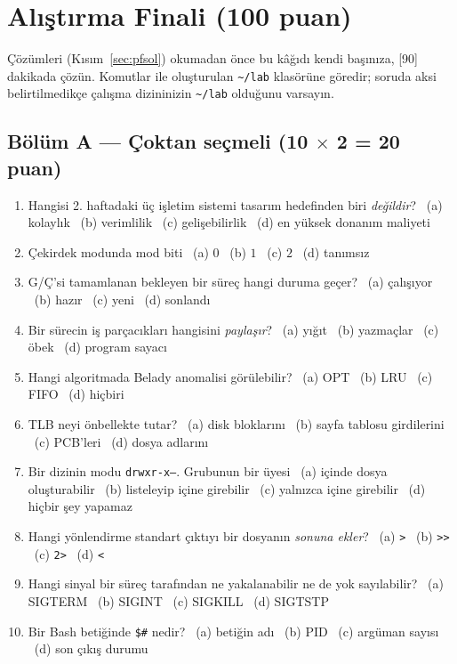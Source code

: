 \section{Alıştırma Finali (100 puan)}
\label{sec:pf}

{\sloppy Çözümleri (Kısım~\ref{sec:pfsol}) okumadan önce bu kâğıdı kendi başınıza, [90] dakikada çözün. Komutlar  ile oluşturulan \texttt{\textasciitilde/lab} klasörüne göredir; soruda aksi belirtilmedikçe çalışma dizininizin \texttt{\textasciitilde/lab} olduğunu varsayın.\par}

\subsection*{Bölüm A --- Çoktan seçmeli (10 $\times$ 2 = 20 puan)}
\begin{enumerate}[leftmargin=1.6em,label=A\arabic*.]
  \item Hangisi 2. haftadaki üç işletim sistemi tasarım hedefinden biri \emph{değildir}? \ (a) kolaylık \ (b) verimlilik \ (c) gelişebilirlik \ (d) en yüksek donanım maliyeti
  \item Çekirdek modunda mod biti \ (a) $0$ \ (b) $1$ \ (c) $2$ \ (d) tanımsız
  \item G/Ç'si tamamlanan bekleyen bir süreç hangi duruma geçer? \ (a) çalışıyor \ (b) hazır \ (c) yeni \ (d) sonlandı
  \item Bir sürecin iş parçacıkları hangisini \emph{paylaşır}? \ (a) yığıt \ (b) yazmaçlar \ (c) öbek \ (d) program sayacı
  \item Hangi algoritmada Belady anomalisi görülebilir? \ (a) OPT \ (b) LRU \ (c) FIFO \ (d) hiçbiri
  \item TLB neyi önbellekte tutar? \ (a) disk bloklarını \ (b) sayfa tablosu girdilerini \ (c) PCB'leri \ (d) dosya adlarını
  \item Bir dizinin modu \texttt{drwxr-x---}. Grubunun bir üyesi \ (a) içinde dosya oluşturabilir \ (b) listeleyip içine girebilir \ (c) yalnızca içine girebilir \ (d) hiçbir şey yapamaz
  \item Hangi yönlendirme standart çıktıyı bir dosyanın \emph{sonuna ekler}? \ (a) \texttt{>} \ (b) \texttt{>>} \ (c) \texttt{2>} \ (d) \texttt{<}
  \item Hangi sinyal bir süreç tarafından ne yakalanabilir ne de yok sayılabilir? \ (a) SIGTERM \ (b) SIGINT \ (c) SIGKILL \ (d) SIGTSTP
  \item Bir Bash betiğinde \texttt{\$\#} nedir? \ (a) betiğin adı \ (b) PID \ (c) argüman sayısı \ (d) son çıkış durumu
\end{enumerate}

